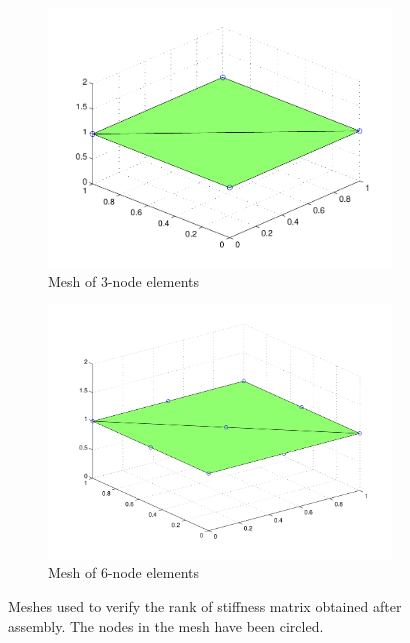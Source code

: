 \documentclass[../main.tex]{subfiles}
\begin{document}
\begin{figure}[ht]
  \centering
  \begin{subfigure}[b]{0.5\textwidth}
    \includegraphics[scale=0.52]{./img/assyStiffRankMesh3.pdf}
    \caption{Mesh of 3-node elements}
    \label{fig:linAssyStiffRank}
  \end{subfigure}%
  \begin{subfigure}[b]{0.5\textwidth}
    \includegraphics[scale=0.39]{./img/assyStiffRankMesh6.pdf}
    \caption{Mesh of 6-node elements}
    \label{fig:quadAssyStiffRank}
  \end{subfigure}
  \caption{Meshes used to verify the rank of stiffness matrix obtained
    after assembly. The nodes in the mesh have been circled.}
  \label{fig:assyStiffRankMesh}
\end{figure}
\end{document}
